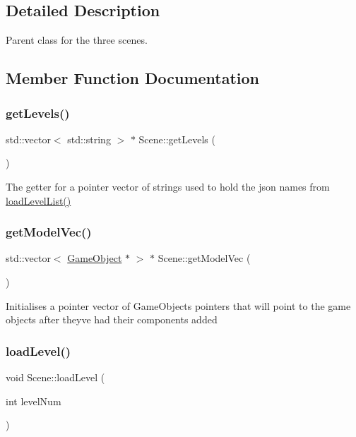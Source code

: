 \subsection{Detailed Description}
Parent class for the three scenes. 

\subsection{Member Function Documentation}
\mbox{\label{class_scene_a81ed92e210490ef87f67d793771d267e}} 
\subsubsection{\texorpdfstring{getLevels()}{getLevels()}}
{\footnotesize\ttfamily std\+::vector$<$ std\+::string $>$ $\ast$ Scene\+::get\+Levels (\begin{DoxyParamCaption}{ }\end{DoxyParamCaption})}

The getter for a pointer vector of strings used to hold the json names from \mbox{\hyperlink{class_scene_a6c6f1a202dcabaa123ec191c206d9e33}{load\+Level\+List()}} \mbox{\label{class_scene_a7e4992f542e3c09a0b876e1efd912d78}} 
\subsubsection{\texorpdfstring{getModelVec()}{getModelVec()}}
{\footnotesize\ttfamily std\+::vector$<$ \mbox{\hyperlink{class_game_object}{Game\+Object}} $\ast$ $>$ $\ast$ Scene\+::get\+Model\+Vec (\begin{DoxyParamCaption}{ }\end{DoxyParamCaption})}

Initialises a pointer vector of Game\+Objects pointers that will point to the game objects after they\textquotesingle{}ve had their components added \mbox{\label{class_scene_a1420e05a757cd71a347c9399860b8e74}} 
\subsubsection{\texorpdfstring{loadLevel()}{loadLevel()}}
{\footnotesize\ttfamily void Scene\+::load\+Level (\begin{DoxyParamCaption}\item[{int}]{level\+Num }\end{DoxyParamCaption})}




